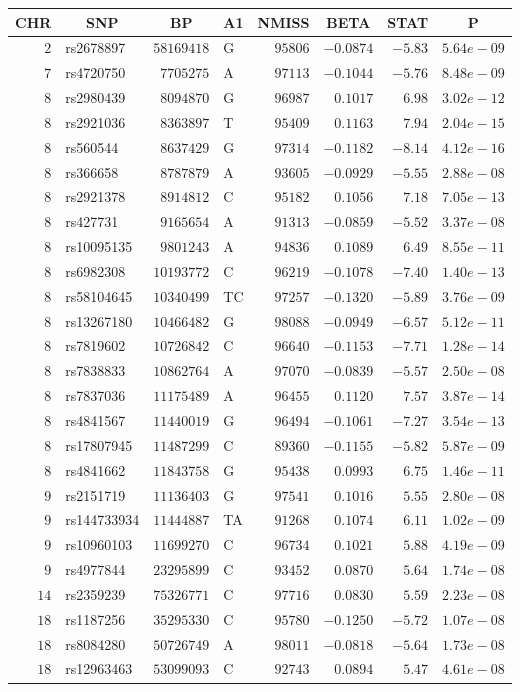 \begin{center}
\begin{tabular}{rlrlrrrr}
\hline\hline
\multicolumn{1}{c}{CHR}&\multicolumn{1}{c}{SNP}&\multicolumn{1}{c}{BP}&\multicolumn{1}{c}{A1}&\multicolumn{1}{c}{NMISS}&\multicolumn{1}{c}{BETA}&\multicolumn{1}{c}{STAT}&\multicolumn{1}{c}{P}\tabularnewline
\hline
$ 2$&rs2678897&$58169418$&G&$95806$&$-0.0874$&$-5.83$&$5.64e-09$\tabularnewline
$ 7$&rs4720750&$ 7705275$&A&$97113$&$-0.1044$&$-5.76$&$8.48e-09$\tabularnewline
$ 8$&rs2980439&$ 8094870$&G&$96987$&$ 0.1017$&$ 6.98$&$3.02e-12$\tabularnewline
$ 8$&rs2921036&$ 8363897$&T&$95409$&$ 0.1163$&$ 7.94$&$2.04e-15$\tabularnewline
$ 8$&rs560544&$ 8637429$&G&$97314$&$-0.1182$&$-8.14$&$4.12e-16$\tabularnewline
$ 8$&rs366658&$ 8787879$&A&$93605$&$-0.0929$&$-5.55$&$2.88e-08$\tabularnewline
$ 8$&rs2921378&$ 8914812$&C&$95182$&$ 0.1056$&$ 7.18$&$7.05e-13$\tabularnewline
$ 8$&rs427731&$ 9165654$&A&$91313$&$-0.0859$&$-5.52$&$3.37e-08$\tabularnewline
$ 8$&rs10095135&$ 9801243$&A&$94836$&$ 0.1089$&$ 6.49$&$8.55e-11$\tabularnewline
$ 8$&rs6982308&$10193772$&C&$96219$&$-0.1078$&$-7.40$&$1.40e-13$\tabularnewline
$ 8$&rs58104645&$10340499$&TC&$97257$&$-0.1320$&$-5.89$&$3.76e-09$\tabularnewline
$ 8$&rs13267180&$10466482$&G&$98088$&$-0.0949$&$-6.57$&$5.12e-11$\tabularnewline
$ 8$&rs7819602&$10726842$&C&$96640$&$-0.1153$&$-7.71$&$1.28e-14$\tabularnewline
$ 8$&rs7838833&$10862764$&A&$97070$&$-0.0839$&$-5.57$&$2.50e-08$\tabularnewline
$ 8$&rs7837036&$11175489$&A&$96455$&$ 0.1120$&$ 7.57$&$3.87e-14$\tabularnewline
$ 8$&rs4841567&$11440019$&G&$96494$&$-0.1061$&$-7.27$&$3.54e-13$\tabularnewline
$ 8$&rs17807945&$11487299$&C&$89360$&$-0.1155$&$-5.82$&$5.87e-09$\tabularnewline
$ 8$&rs4841662&$11843758$&G&$95438$&$ 0.0993$&$ 6.75$&$1.46e-11$\tabularnewline
$ 9$&rs2151719&$11136403$&G&$97541$&$ 0.1016$&$ 5.55$&$2.80e-08$\tabularnewline
$ 9$&rs144733934&$11444887$&TA&$91268$&$ 0.1074$&$ 6.11$&$1.02e-09$\tabularnewline
$ 9$&rs10960103&$11699270$&C&$96734$&$ 0.1021$&$ 5.88$&$4.19e-09$\tabularnewline
$ 9$&rs4977844&$23295899$&C&$93452$&$ 0.0870$&$ 5.64$&$1.74e-08$\tabularnewline
$14$&rs2359239&$75326771$&C&$97716$&$ 0.0830$&$ 5.59$&$2.23e-08$\tabularnewline
$18$&rs1187256&$35295330$&C&$95780$&$-0.1250$&$-5.72$&$1.07e-08$\tabularnewline
$18$&rs8084280&$50726749$&A&$98011$&$-0.0818$&$-5.64$&$1.73e-08$\tabularnewline
$18$&rs12963463&$53099093$&C&$92743$&$ 0.0894$&$ 5.47$&$4.61e-08$\tabularnewline
\hline
\end{tabular}\end{center}
